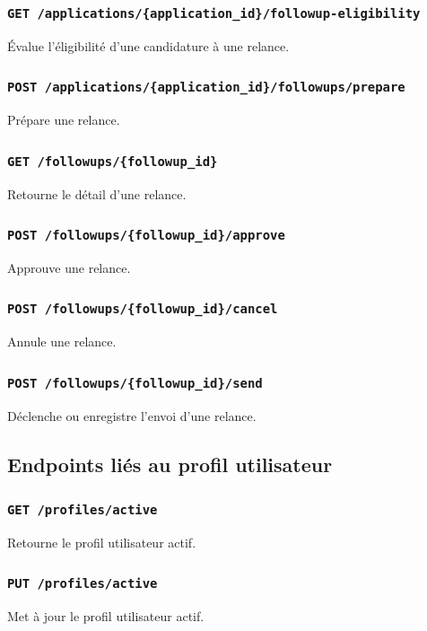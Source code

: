 \documentclass[11pt,a4paper]{article}
\begin{document}
\subsubsection{\texttt{GET /applications/\{application\_id\}/followup-eligibility}}
Évalue l’éligibilité d’une candidature à une relance.

\subsubsection{\texttt{POST /applications/\{application\_id\}/followups/prepare}}
Prépare une relance.

\subsubsection{\texttt{GET /followups/\{followup\_id\}}}
Retourne le détail d’une relance.

\subsubsection{\texttt{POST /followups/\{followup\_id\}/approve}}
Approuve une relance.

\subsubsection{\texttt{POST /followups/\{followup\_id\}/cancel}}
Annule une relance.

\subsubsection{\texttt{POST /followups/\{followup\_id\}/send}}
Déclenche ou enregistre l’envoi d’une relance.

\subsection{Endpoints liés au profil utilisateur}

\subsubsection{\texttt{GET /profiles/active}}
Retourne le profil utilisateur actif.

\subsubsection{\texttt{PUT /profiles/active}}
Met à jour le profil utilisateur actif.
\end{document}
